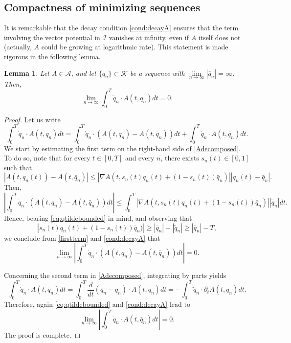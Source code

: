 \documentclass{article}
\newcommand{\boK}{\mathcal{K}}
\newcommand{\boI}{\mathcal{I}}
\newcommand{\boA}{\mathcal{A}}
\newcommand{\dq}{\dot{q}}
\newtheorem{lemma}{Lemma}[section]
\theoremstyle{definition}
\begin{document}
    
\subsection{Compactness of minimizing sequences}

It is remarkable that the decay condition \eqref{cond:decayA} ensures that the term involving the vector potential in $\boI$  vanishes at infinity, even if $A$ itself does not (actually, $A$ could be growing at logarithmic rate). This statement is made rigorous in the following lemma.

\begin{lemma}\label{lemma:vanishing}
    Let $A\in\boA$, and let $\{q_n\}\subset\boK$ be a sequence with $\lim\limits_{n\to\infty}|\bar q_n|=\infty$. Then,
    \begin{equation}
         \lim_{n\to\infty}\int_0^T \dq_n\cdot A(t,q_n)dt= 0.\label{statement:vanishingA}
    \end{equation}
\end{lemma}
\begin{proof}

Let us write
\begin{equation}\label{Adecomposed}
    \int_0^T\dq_n\cdot A(t,q_n)dt=\int_0^T \dq_n\cdot (A(t,q_n)-A(t,\bar q_n))dt + \int_0^T\dq_n\cdot A(t,\bar q_n)dt.
\end{equation}
We start by estimating the first term on the right-hand side of \eqref{Adecomposed}. To do so, note that for every $t\in [0,T]$ and every $n$, there exists $s_n(t)\in [0,1]$ such that
\begin{equation*}
    |A(t,q_n(t))-A(t,\bar q_n)|\leq |\nabla A(t,s_n(t)q_n(t)+(1-s_n(t))\bar q_n)||q_n(t)-\bar q_n|.
\end{equation*}
Then,
\begin{equation}\label{firstterm}
    \left|\int_0^T \dq_n\cdot (A(t,q_n)-A(t,\bar q_n))dt\right|\leq \int_0^T|\nabla A(t,s_n(t)q_n(t)+(1-s_n(t))\bar q_n)||\tilde q_n|dt.
\end{equation}
Hence, bearing \eqref{eq:qtildebounded} in mind, and observing that
\[|s_n(t)q_n(t)+(1-s_n(t))\bar q_n)|\geq |\bar q_n|-|\tilde q_n|\geq |\bar q_n|-T,\]
we conclude from \eqref{firstterm} and \eqref{cond:decayA} that
\begin{equation}
    \lim_{n\to\infty}\left|\int_0^T \dq_n\cdot (A(t,q_n)-A(t,\bar q_n))dt\right|=0.
\end{equation}

Concerning the second term in \eqref{Adecomposed}, integrating by parts yields
\begin{equation*}
    \int_0^T \dq_n\cdot A(t,\bar q_n)dt=\int_0^T \frac{d}{dt}(q_n-\bar q_n)\cdot A(t,\bar q_n)dt=-\int_0^T\tilde q_n\cdot \partial_t A(t,\bar q_n)dt.
\end{equation*}
Therefore, again \eqref{eq:qtildebounded} and \eqref{cond:decayA} lead to
\begin{equation*}
    \lim_{n\to\infty}\left|\int_0^T \dq_n\cdot A(t,\bar q_n)dt\right|=0.
\end{equation*}
The proof is complete.
\end{proof}
\end{document}
